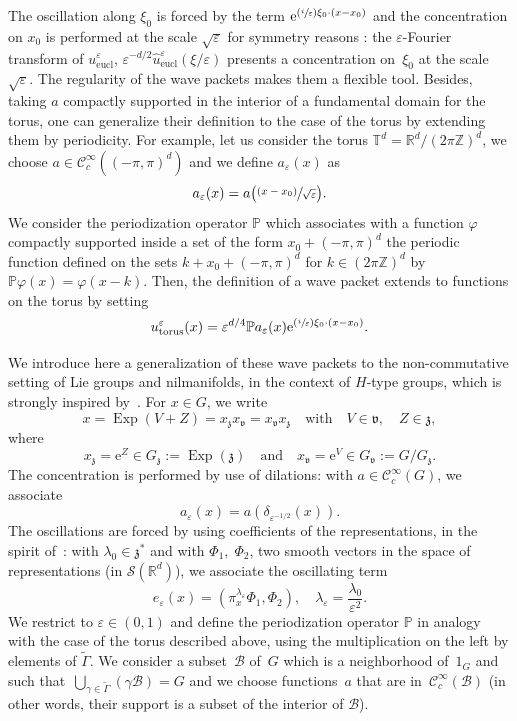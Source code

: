 \documentclass[10pt]{amsart}
\let\mathcal\mathscr
\newcommand{\Psfrac}[2]{(\sfrac{#1}{#2})}
\newcommand{\psfrac}[2]{\sfrac{(#1)}{#2}}
\newcommand{\eucl}{\mathrm{eucl}}
\newcommand{\rme}{\mathrm{e}}
\DeclareMathOperator{\Exp}{Exp}
\theoremstyle{plain}
\theoremstyle{definition}
\let\eps\varepsilon
\def\R{{\mathbb R}}
\def\Z{{\mathbb Z}}
\def\T{{\mathbb T}}
\def\bbP{{\mathbb P}}
\begin{document}
The oscillation along $\xi_0$ is forced by the term $\rme^{\Psfrac i\eps \xi_0\cdot(x-x_0)}$ and the concentration on $x_0$ is performed at the scale $\sqrt\eps$ for symmetry reasons : the $\eps$-Fourier transform of $u^\eps_\eucl$,
$\eps^{-d/2}\widehat u^\eps_\eucl (\xi/\eps)$ presents a concentration on~$\xi_0$ at the scale $\sqrt\eps$. The regularity of the wave packets makes them a flexible tool. Besides, taking $a$ compactly supported in the interior of a fundamental domain for the torus, one can generalize their definition to the case of the torus by extending them by periodicity. For example, let us consider the torus $\T^d=\R^d/(2\pi\Z)^d$, we choose $a\in{\mathcal C}_c^\infty((-\pi,\pi)^d)$ and we define $a_\eps(x) $ as
\[
a_\eps(x) = a\bigl(\psfrac{x-x_0}{\sqrt\eps}\bigr).
\]
We consider the periodization operator $\bbP$ which associates with a function $\varphi$ compactly supported inside a set of the form $x_0+(-\pi,\pi)^d$ the periodic function defined on the sets $k+x_0+(-\pi,\pi)^d$ for $k\in(2\pi\Z)^d$ by
$\bbP \varphi(x)= \varphi(x-k)$. Then, the definition of a wave packet extends to functions on the torus by setting
\[
u_\mathrm{torus}^\eps(x)= \eps^{d/4} \bbP a_\eps(x)\rme^{\Psfrac i\eps \xi_0\cdot(x-x_0)}.
\]

We introduce here a generalization of these wave packets to the non-commutative setting of Lie groups and nilmanifolds, in the context of $H$-type groups, which is strongly inspired by~\cite{FF1}.
For $x\in G$, we write
\[
x=\Exp(V+Z)= x_{\mathfrak z} x_{\mathfrak v} = x_{\mathfrak v} x_{\mathfrak z} \quad \text{with}\quad V\in{\mathfrak v},\quad Z\in{\mathfrak z},
\]
where
\[
x_{\mathfrak z} =\rme^Z\in G_{\mathfrak z}:=\Exp (\mathfrak z)\quad \text{and}\quad x_{\mathfrak v}=\rme^V\in G_{\mathfrak v}:=G/ G_{\mathfrak z}.
\]
The concentration is performed by use of dilations: with $a\in\mathcal C_c^\infty(G)$, we associate
\[
a_\eps(x)=a \left(\delta_{\eps^{-1/2 }}(x)\right).
\]
The oscillations are forced by using coefficients of the representations, in the spirit of~\cite{pedersen}: with $\lambda_0\in\mathfrak z^*$ and with
$\Phi_1,\; \Phi_2$, two smooth vectors in the space of representations (\ie in ${\mathcal S}(\R^d)$), we associate the oscillating term
\[
e_\eps(x)=\left(\pi^{\lambda_\eps}_x \Phi_1, \Phi_2\right), \quad \lambda_\eps= \frac{\lambda_0}{\eps^2}.
\]
We restrict to $\eps\in (0,1)$ and define the periodization operator $\bbP$ in analogy with the case of the torus described above, using the multiplication on the left by elements of $\widetilde\Gamma$. We consider a subset~$\mathcal B$ of~$G$ which is a neighborhood of~$1_G$ and such that~$\bigcup_{\gamma\in \widetilde{\Gamma}} (\gamma {\mathcal B})=G$ and we choose functions~$a$ that are in~${\mathcal C}^\infty_c(\mathcal B)$ (in other words, their support is a subset of the interior of $\mathcal B$).
\end{document}
